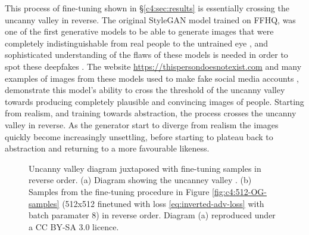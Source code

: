 This process of fine-tuning shown in \S \ref{c4:sec:results} is essentially crossing the uncanny valley in reverse.
The original StyleGAN model trained on FFHQ, was one of the first generative models to be able to generate images that were completely indistinguishable from real people to the untrained eye \citep{ajder2019state}, and sophisticated understanding of the flaws of these models is needed in order to spot these deepfakes \citep{mcdonald2018how}. 
The website \url{https://thispersondoesnotexist.com} and many examples of images from these models used to make fake social media accounts \citep{satter2019spy}, demonstrate this model's ability to cross the threshold of the uncanny valley towards producing completely plausible and convincing images of people.
Starting from realism, and training towards abstraction, the process crosses the uncanny valley in reverse. 
As the generator start to diverge from realism the images quickly become increasingly unsettling, before starting to plateau back to abstraction and returning to a more favourable likeness.

\begin{figure}[!htbp]
  \centering
  \hfill
  \caption[Uncanny valley diagram juxtaposed with samples from fine-tuning process]{Uncanny valley diagram juxtaposed with fine-tuning samples in reverse order. (a) Diagram showing the uncanney valley \citep{mori1970uncanny}. (b) Samples from the fine-tuning procedure in Figure \ref{fig:c4:512-OG-samples} (512x512 finetuned with loss \ref{eq:inverted-adv-loss} with batch paramater 8) in reverse order. Diagram (a) reproduced under a CC BY-SA 3.0 licence. }
  \label{fig:c4:uncanny-valley-comparison}
\end{figure}

